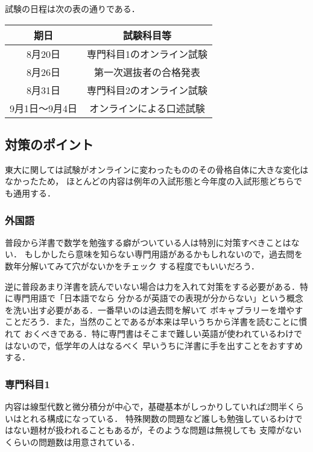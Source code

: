 \documentclass[uplatex]{jsarticle}
\begin{document}
\newpage %
試験の日程は次の表の通りである．
\begin{table}[h]
  \begin{center}
    \begin{tabular}{|c|c|} \hline
      期日 & 試験科目等 \\ \hline \hline
      8月20日 &\quad 専門科目1のオンライン試験 \quad \\ \hline
      8月26日 &  \quad 第一次選抜者の合格発表 \quad \\ \hline
      8月31日 & \quad 専門科目2のオンライン試験 \quad \\ \hline
      9月1日～9月4日 & \quad オンラインによる口述試験 \quad \\ \hline
    \end{tabular}
  \end{center}
  \end{table}

\subsection*{対策のポイント}
東大に関しては試験がオンラインに変わったもののその骨格自体に大きな変化はなかったため，
ほとんどの内容は例年の入試形態と今年度の入試形態どちらでも通用する．

\subsubsection*{外国語}
普段から洋書で数学を勉強する癖がついている人は特別に対策すべきことはない．
もしかしたら意味を知らない専門用語があるかもしれないので，過去問を数年分解いてみて穴がないかをチェック
する程度でもいいだろう．

逆に普段あまり洋書を読んでいない場合は力を入れて対策をする必要がある．特に専門用語で「日本語でなら
分かるが英語での表現が分からない」という概念を洗い出す必要がある．一番早いのは過去問を解いて
ボキャブラリーを増やすことだろう．また，当然のことであるが本来は早いうちから洋書を読むことに慣れて
おくべきである．特に専門書はそこまで難しい英語が使われているわけではないので，低学年の人はなるべく
早いうちに洋書に手を出すことをおすすめする．

\subsubsection*{専門科目1}
内容は線型代数と微分積分が中心で，基礎基本がしっかりしていれば2問半くらいはとれる構成になっている．
特殊関数の問題など誰しも勉強しているわけではない題材が扱われることもあるが，そのような問題は無視しても
支障がないくらいの問題数は用意されている．
\end{document}

